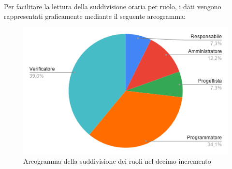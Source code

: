 \documentclass[../piano-di-progetto.tex]{subfiles}
\begin{document}
  Per facilitare la lettura della suddivisione oraria per ruolo, i dati vengono rappresentati graficamente mediante il seguente areogramma:
  \begin{figure}[H]
    \centering
    \includegraphics[width=12cm]{img/ruoli-10-incr.png}
    \caption{Areogramma della suddivisione dei ruoli nel decimo incremento}
    \label{fig:ore-ruolo-progettazione}
  \end{figure}
\end{document}
